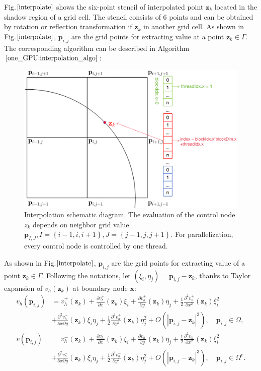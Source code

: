 Fig.$\ref{interpolate}$ shows the six-point stencil of interpolated point $\mathbf{z}_{k}$ located in the shadow region of a grid cell. The stencil consists of 6 points and can be obtained by rotation or reflection transformation if $\mathbf{z}_{k}$ in another grid cell. As shown in Fig.$\ref{interpolate}$, $\mathbf{p}_{i,j}$ are the grid points for extracting value at a point $\mathbf{z}_{k} \in \Gamma$. The corresponding algorithm can be described in Algorithm $\ref{one_GPU:interpolation_algo}$:
\begin{figure}[hbpt!]
    \centering
    \includegraphics[width = 0.62\linewidth]{figure/one_gpu_interpolate_new2.eps}
    \caption{Interpolation schematic diagram. The evaluation of the control node $z_{k}$ depends on neighbor grid value $\mathbf{p}_{I,J}, I = \left\{i-1, i, i+1\right\}, J = \left\{j-1, j, j+1\right\}$. For parallelization, every control node is controlled by one thread. }
    \label{interpolate}
\end{figure}
\iffalse
As shown in Fig.$\ref{interpolate}$, $\mathbf{p}_{i,j}$ are the grid points for extracting value of a point $\mathbf{z}_{k} \in \Gamma$. Following the notations, let $(\xi_{i}, \eta_{j}) = \mathbf{p}_{i,j} - \mathbf{z}_{k}$, thanks to Taylor expansion of $v_{h}(\mathbf{z}_{k})$ at boundary node $\mathbf{x}$:
\begin{equation}
    \begin{aligned}
    v_{h}(\mathbf{p}_{i,j}) & = v_{h}^{+}(\mathbf{z}_{k})+ \frac{\partial v_{h}^{+}}{\partial x}(\mathbf{z}_{k})\xi_{i} + \frac{\partial v_{h}^{+}}{\partial y}(\mathbf{z}_{k}) \eta_{j} + \frac{1}{2}\frac{\partial^{2} v_{h}^{+}}{\partial x^{2}}(\mathbf{z}_{k})\xi_{i}^{2}\\
    & + \frac{\partial^{2} v_{h}^{+}}{\partial x \partial y}(\mathbf{z}_{k})\xi_{i}\eta_{j} + \frac{1}{2}\frac{\partial^{2} v_{h}^{+}}{\partial y^{2}}(\mathbf{z}_{k})\eta_{j}^{2} + O(|\mathbf{p}_{i,j} - \mathbf{z}_{k}|^{3}), \quad \mathbf{p}_{i,j} \in \Omega, \\
    v(\mathbf{p}_{i,j}) & = v_{h}^{-}(\mathbf{z}_{k})+ \frac{\partial v_{h}^{-}}{\partial x}(\mathbf{z}_{k})\xi_{i} + \frac{\partial v_{h}^{-}}{\partial y}(\mathbf{z}_{k}) \eta_{j} + \frac{1}{2}\frac{\partial^{2} v_{h}^{-}}{\partial x^{2}}(\mathbf{z}_{k})\xi_{i}^{2}\\
    & + \frac{\partial^{2} v_{h}^{-}}{\partial x \partial y}(\mathbf{z}_{k})\xi_{i}\eta_{j} + \frac{1}{2}\frac{\partial^{2} v_{h}^{-}}{\partial y^{2}}(\mathbf{z}_{k})\eta_{j}^{2} + O(|\mathbf{p}_{i,j} - \mathbf{z}_{k}|^{3}), \quad \mathbf{p}_{i,j} \in \Omega^{c}. \label{interpolate2}
    \end{aligned}
\end{equation}


